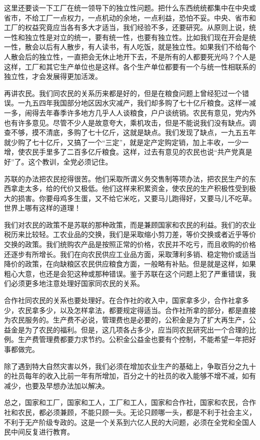 这里还要谈一下工厂在统一领导下的独立性问题。把什么东西统统都集中在中央或省市，不给工厂一点权力，一点机动的余地，一点利益，恐怕不妥。中央、省市和工厂的权益究竟应当各有多大才适当，我们经验不多，还要研究。从原则上说，统一性和独立性是对立的统一，要有统一性，也要有独立性。比如我们现在开会是统一性，散会以后有人散步，有人读书，有人吃饭，就是独立性。如果我们不给每个人散会后的独立性，一直把会无休止地开下去，不是所有的人都要死光吗？个人是这样，工厂和其它生产单位也是这样。各个生产单位都要有一个与统一性相联系的独立性，才会发展得更加活泼。

再讲农民。我们同农民的关系历来都是好的，但是在粮食问题上曾经犯过一个错误。一九五四年我国部分地区因水灾减产，我们却多购了七十亿斤粮食。这样一减一多，闹得去年春季许多地方几乎人人谈粮食，户户谈统销。农民有意见，党内外也有许多意见。尽管不少人是故意夸大，乘机攻击，但是不能说我们没有缺点。调查不够，摸不清底，多购了七十亿斤，这就是缺点。我们发现了缺点，一九五五年就少购了七十亿斤，又搞了一个“三定”，就是定产定购定销，加上丰收，一少一增，使农民手里多了二百多亿斤粮食。这样，过去有意见的农民也说“共产党真是好”了。这个教训，全党必须记住。

苏联的办法把农民挖得很苦。他们采取所谓义务交售制等项办法，把农民生产的东西拿走太多，给的代价又极低。他们这样来积累资金，使农民的生产积极性受到极大的损害。你要母鸡多生蛋，又不给它米吃，又要马儿跑得好，又要马儿不吃草。世界上哪有这样的道理！

我们对农民的政策不是苏联的那种政策，而是兼顾国家和农民的利益。我们的农业税历来比较轻。工农业品的交换，我们是采取缩小剪刀差，等价交换或者近乎等价交换的政策。我们统购农产品是按照正常的价格，农民并不吃亏，而且收购的价格还逐步有所增长。我们在向农民供应工业品方面，采取薄利多销、稳定物价或适当降价的政策，在向缺粮区农民供应粮食方面，一般略有补贴。但是就是这样，如果粗心大意，也还是会犯这种或那种错误。鉴于苏联在这个问题上犯了严重错误，我们必须更多地注意处理好国家同农民的关系。

合作社同农民的关系也要处理好。在合作社的收入中，国家拿多少，合作社拿多少，农民拿多少，以及怎样拿法，都要规定得适当。合作社所拿的部分，都是直接为农民服务的。生产费不必说，管理费也是必要的，公积金是为了扩大再生产，公益金是为了农民的福利。但是，这几项各占多少，应当同农民研究出一个合理的比例。生产费管理费都要力求节约。公积金公益金也要有个控制，不能希望一年把好事都做完。

除了遇到特大自然灾害以外，我们必须在增加农业生产的基础上，争取百分之九十的社员每年的收入比前一年有所增加，百分之十的社员的收入能够不增不减，如有减少，也要及早想办法加以解决。

总之，国家和工厂，国家和工人，工厂和工人，国家和合作社，国家和农民，合作社和农民，都必须兼顾，不能只顾一头。无论只顾哪一头，都是不利于社会主义，不利于无产阶级专政的。这是一个关系到六亿人民的大问题，必须在全党和全国人民中间反复进行教育。

